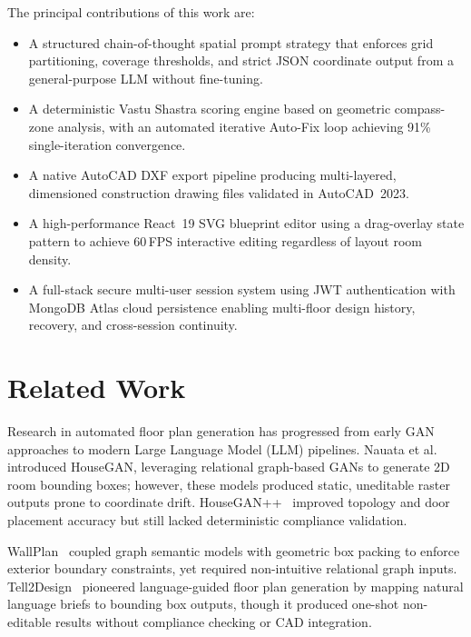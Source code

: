 \documentclass[10pt, twocolumn, letterpaper]{article}
\begin{document}
The principal contributions of this work are:
\begin{itemize}[leftmargin=*, itemsep=0pt, topsep=2pt]
  \item A structured chain-of-thought spatial prompt strategy that enforces
        grid partitioning, coverage thresholds, and strict JSON coordinate
        output from a general-purpose LLM without fine-tuning.
  \item A deterministic Vastu Shastra scoring engine based on geometric
        compass-zone analysis, with an automated iterative Auto-Fix loop
        achieving 91\% single-iteration convergence.
  \item A native AutoCAD DXF export pipeline producing multi-layered,
        dimensioned construction drawing files validated in AutoCAD~2023.
  \item A high-performance React~19 SVG blueprint editor using a
        drag-overlay state pattern to achieve 60\,FPS interactive editing
        regardless of layout room density.
  \item A full-stack secure multi-user session system using JWT authentication
        with MongoDB Atlas cloud persistence enabling multi-floor design
        history, recovery, and cross-session continuity.
\end{itemize}

\section{Related Work}

Research in automated floor plan generation has progressed from early GAN
approaches to modern Large Language Model (LLM) pipelines. Nauata et al.~\cite{houseGAN}
introduced HouseGAN, leveraging relational graph-based GANs to generate
2D room bounding boxes; however, these models produced static, uneditable
raster outputs prone to coordinate drift. HouseGAN++~\cite{houseGANpp}
improved topology and door placement accuracy but still lacked deterministic
compliance validation.

WallPlan~\cite{wallplan} coupled graph semantic models with geometric box
packing to enforce exterior boundary constraints, yet required non-intuitive
relational graph inputs. Tell2Design~\cite{tell2design} pioneered
language-guided floor plan generation by mapping natural language briefs to
bounding box outputs, though it produced one-shot non-editable results without
compliance checking or CAD integration.
\end{document}
